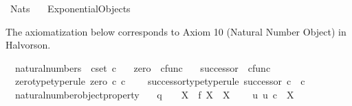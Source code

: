 %
\begin{isabellebody}%
%
%
\isadelimdocument
%
\endisadelimdocument
%
\isatagdocument
%
\isamarkuptrue%
%
\endisatagdocument
{\isafolddocument}%
%
\isadelimdocument
%
\endisadelimdocument
%
\isadelimtheory
%
\endisadelimtheory
%
\isatagtheory
{}\isamarkupfalse%
\ Nats\isanewline
\ \ \ Exponential{\isacharunderscore}{\kern0pt}Objects\isanewline
{}%
\endisatagtheory
{\isafoldtheory}%
%
\isadelimtheory
%
\endisadelimtheory
%
\begin{isamarkuptext}%
The axiomatization below corresponds to Axiom 10 (Natural Number Object) in Halvorson.%
\end{isamarkuptext}\isamarkuptrue%
\isamarkupfalse%
\isanewline
\ \ natural{\isacharunderscore}{\kern0pt}numbers\ {\isacharcolon}{\kern0pt}{\isacharcolon}{\kern0pt}\ {\isachardoublequoteopen}cset{\isachardoublequoteclose}\ {\isacharparenleft}{\kern0pt}{\isachardoublequoteopen}{\isasymnat}\isactrlsub c{\isachardoublequoteclose}{\isacharparenright}{\kern0pt}\ \isanewline
\ \ zero\ {\isacharcolon}{\kern0pt}{\isacharcolon}{\kern0pt}\ {\isachardoublequoteopen}cfunc{\isachardoublequoteclose}\ \isanewline
\ \ successor\ {\isacharcolon}{\kern0pt}{\isacharcolon}{\kern0pt}\ {\isachardoublequoteopen}cfunc{\isachardoublequoteclose}\isanewline
\ \ \isanewline
\ \ zero{\isacharunderscore}{\kern0pt}type{\isacharbrackleft}{\kern0pt}type{\isacharunderscore}{\kern0pt}rule{\isacharbrackright}{\kern0pt}{\isacharcolon}{\kern0pt}\ {\isachardoublequoteopen}zero\ {\isasymin}\isactrlsub c\ {\isasymnat}\isactrlsub c{\isachardoublequoteclose}\ \ \isanewline
\ \ successor{\isacharunderscore}{\kern0pt}type{\isacharbrackleft}{\kern0pt}type{\isacharunderscore}{\kern0pt}rule{\isacharbrackright}{\kern0pt}{\isacharcolon}{\kern0pt}\ {\isachardoublequoteopen}successor{\isacharcolon}{\kern0pt}\ {\isasymnat}\isactrlsub c\ {\isasymrightarrow}\ {\isasymnat}\isactrlsub c{\isachardoublequoteclose}\ \ \isanewline
\ \ natural{\isacharunderscore}{\kern0pt}number{\isacharunderscore}{\kern0pt}object{\isacharunderscore}{\kern0pt}property{\isacharcolon}{\kern0pt}\ \isanewline
\ \ {\isachardoublequoteopen}q\ {\isacharcolon}{\kern0pt}\ {\isasymone}\ {\isasymrightarrow}\ X\ {\isasymLongrightarrow}\ f{\isacharcolon}{\kern0pt}\ X\ {\isasymrightarrow}\ X\ {\isasymLongrightarrow}\isanewline
\ \ \ {\isacharparenleft}{\kern0pt}{\isasymexists}{\isacharbang}{\kern0pt}u{\isachardot}{\kern0pt}\ u{\isacharcolon}{\kern0pt}\ {\isasymnat}\isactrlsub c\ {\isasymrightarrow}\ X\ {\isasymand}\isanewline

\end{isabellebody}
